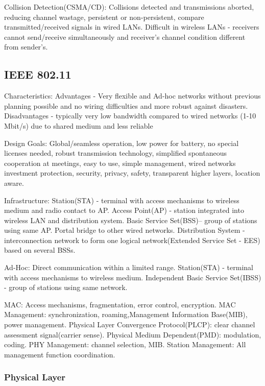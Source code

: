 \documentclass[9pt]{extarticle}
\begin{document}
\begin{multicols}{2}
Collision Detection(CSMA/CD): Collisions detected and transmissions aborted, reducing channel
wastage, persistent or non-persistent, compare transmitted/received signals in wired LANs. Difficult in wireless LANs -  receivers cannot send/receive simultaneously and receiver’s channel condition different from sender's.

\subsection{IEEE 802.11}

Characteristics:  Advantages - Very flexible and Ad-hoc networks without previous planning possible and no wiring difficulties and more robust against disasters. Disadvantages - typically very low bandwidth compared to wired networks (1-10 Mbit/s) due to shared medium and less reliable

Design Goals: Global/seamless operation, low power for battery, no special licenses needed, robust transmission technology, simplified spontaneous cooperation at meetings, easy to use, simple management, wired networks investment protection, security, privacy, safety, transparent higher layers, location aware.

Infrastructure: Station(STA) - terminal with access mechanisms to wireless medium and radio contact to AP. Access Point(AP) - station integrated into wireless LAN and distribution system. Basic Service Set(BSS)– group of stations using same AP. Portal bridge to other wired networks. Distribution System - interconnection network to form one logical network(Extended Service Set - EES) based on several BSSs.

Ad-Hoc: Direct communication within a limited range. Station(STA) - terminal with access mechanisms to wireless medium. Independent Basic Service Set(IBSS) - group of stations using same network.

MAC: Access mechanisms, fragmentation, error control, encryption. MAC Management: synchronization, roaming,Management Information Base(MIB), power management. Physical Layer Convergence Protocol(PLCP): clear channel assessment signal(carrier sense).  Physical Medium Dependent(PMD): modulation, coding. PHY Management: channel selection, MIB. Station Management: All
management function coordination.

\subsubsection{Physical Layer}


\end{multicols}
\end{document}
